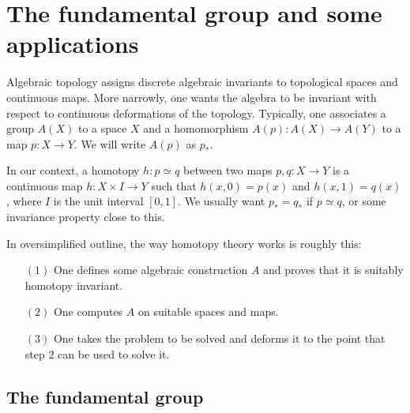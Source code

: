 \chapter{The fundamental group and some applications}
Algebraic topology assigns discrete algebraic invariants to topological spaces and continuous maps. More narrowly, one wants the algebra to be invariant with respect to continuous deformations of the topology. Typically, one associates a group $A(X)$ to a space $X$ and a homomorphism $A(p):A(X)\to A(Y)$ to a map $p:X\to Y$. We will write $A(p)$ as $p_*$.\par
In our context, a homotopy $h:p\simeq q$ between two maps $p,q:X\to Y$ is a continuous map $h:X\times I\to Y$ such that $h(x,0)=p(x)$ and $h(x,1)=q(x)$, where $I$ is the unit interval $[0,1]$. We usually want $p_*=q_*$ if $p\simeq q$, or some invariance property close to this.\par
In oversimplified outline, the way homotopy theory works is roughly this:
\begin{itemize}
\item[$(1)$] One defines some algebraic construction $A$ and proves that it is suitably homotopy invariant.
\item[$(2)$] One computes $A$ on suitable spaces and maps.
\item[$(3)$] One takes the problem to be solved and deforms it to the point that step $2$ can be used to solve it.
\end{itemize}
\section{The fundamental group}
